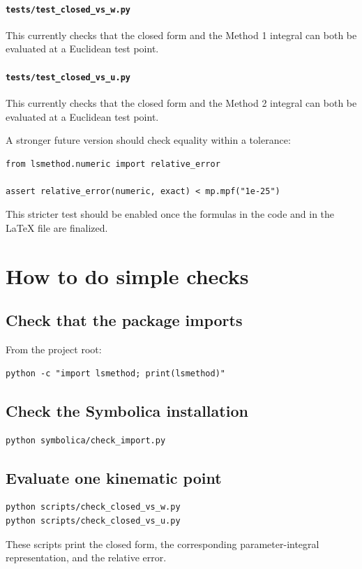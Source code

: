 \documentclass[11pt,a4paper]{article}
\begin{document}
\paragraph{\texttt{tests/test\_closed\_vs\_w.py}}
This currently checks that the closed form and the Method 1 integral can both be evaluated at a Euclidean test point.

\paragraph{\texttt{tests/test\_closed\_vs\_u.py}}
This currently checks that the closed form and the Method 2 integral can both be evaluated at a Euclidean test point.

A stronger future version should check equality within a tolerance:
\begin{lstlisting}
from lsmethod.numeric import relative_error

assert relative_error(numeric, exact) < mp.mpf("1e-25")
\end{lstlisting}
This stricter test should be enabled once the formulas in the code and in the LaTeX file are finalized.

\section{How to do simple checks}

\subsection{Check that the package imports}

From the project root:
\begin{lstlisting}
python -c "import lsmethod; print(lsmethod)"
\end{lstlisting}

\subsection{Check the Symbolica installation}

\begin{lstlisting}
python symbolica/check_import.py
\end{lstlisting}

\subsection{Evaluate one kinematic point}

\begin{lstlisting}
python scripts/check_closed_vs_w.py
python scripts/check_closed_vs_u.py
\end{lstlisting}
These scripts print the closed form, the corresponding parameter-integral representation, and the relative error.
\end{document}
